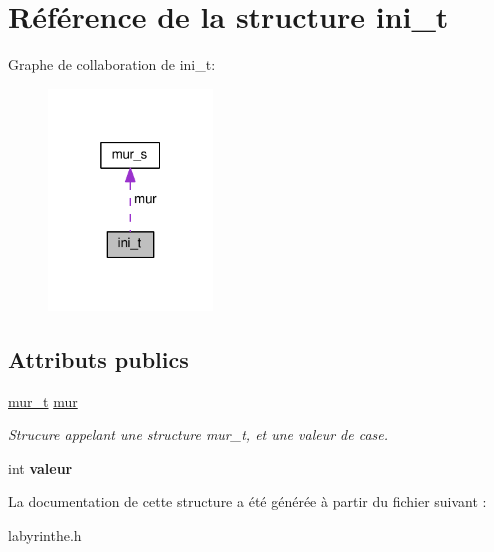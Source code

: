 \hypertarget{structini__t}{}\section{Référence de la structure ini\+\_\+t}
\label{structini__t}


Graphe de collaboration de ini\+\_\+t\+:
\nopagebreak
\begin{figure}[H]
\begin{center}
\leavevmode
\includegraphics[width=124pt]{structini__t__coll__graph}
\end{center}
\end{figure}
\subsection*{Attributs publics}
\begin{DoxyCompactItemize}
\item 
\hyperlink{structmur__s}{mur\+\_\+t} \hyperlink{structini__t_a05761ad37f05a88ecaa33a8c380aacda}{mur}\hypertarget{structini__t_a05761ad37f05a88ecaa33a8c380aacda}{}\label{structini__t_a05761ad37f05a88ecaa33a8c380aacda}

\begin{DoxyCompactList}\small\item\em Strucure appelant une structure mur\+\_\+t, et une valeur de case. \end{DoxyCompactList}\item 
int {\bfseries valeur}\hypertarget{structini__t_a1465159977fe10d194f9117c8c664834}{}\label{structini__t_a1465159977fe10d194f9117c8c664834}

\end{DoxyCompactItemize}


La documentation de cette structure a été générée à partir du fichier suivant \+:\begin{DoxyCompactItemize}
\item 
labyrinthe.\+h\end{DoxyCompactItemize}
